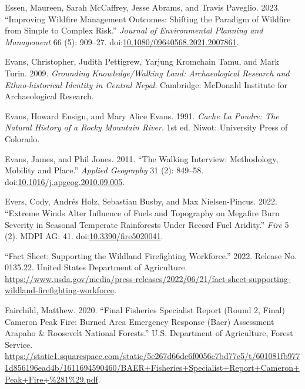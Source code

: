 \documentclass[
]{article}
\newlength{\cslhangindent}
\newenvironment{CSLReferences}[2] %
 {\begin{list}{}{%
  \setlength{\itemindent}{0pt}
  \setlength{\leftmargin}{0pt}
  \setlength{\parsep}{0pt}
  \ifodd #1
   \setlength{\leftmargin}{\cslhangindent}
   \setlength{\itemindent}{-1\cslhangindent}
  \fi
  \setlength{\itemsep}{#2\baselineskip}}}
 {\end{list}}
\begin{document}
\begin{CSLReferences}{1}{0}
Essen, Maureen, Sarah McCaffrey, Jesse Abrams, and Travis Paveglio. 2023. {``Improving Wildfire Management Outcomes: Shifting the Paradigm of Wildfire from Simple to Complex Risk.''} \emph{Journal of Environmental Planning and Management} 66 (5): 909--27. doi:\href{https://doi.org/10.1080/09640568.2021.2007861}{10.1080/09640568.2021.2007861}.

Evans, Christopher, Judith Pettigrew, Yarjung Kromchain Tamu, and Mark Turin. 2009. \emph{Grounding {Knowledge}/{Walking Land}: {Archaeological Research} and {Ethno-historical Identity} in {Central Nepal}}. Cambridge: McDonald Institute for Archaeological Research.

Evans, Howard Ensign, and Mary Alice Evans. 1991. \emph{Cache La {Poudre}: The Natural History of a {Rocky Mountain} River}. 1st ed. Niwot: University Press of Colorado.

Evans, James, and Phil Jones. 2011. {``The Walking Interview: {Methodology}, Mobility and Place.''} \emph{Applied Geography} 31 (2): 849--58. doi:\href{https://doi.org/10.1016/j.apgeog.2010.09.005}{10.1016/j.apgeog.2010.09.005}.

Evers, Cody, Andrés Holz, Sebastian Busby, and Max Nielsen-Pincus. 2022. {``Extreme {Winds Alter Influence} of {Fuels} and {Topography} on {Megafire Burn Severity} in {Seasonal Temperate Rainforests} Under {Record Fuel Aridity}.''} \emph{Fire} 5 (2). MDPI AG: 41. doi:\href{https://doi.org/10.3390/fire5020041}{10.3390/fire5020041}.

{``Fact {Sheet}: {Supporting} the {Wildland Firefighting Workforce}.''} 2022. Release No. 0135.22. United States Department of Agriculture. \url{https://www.usda.gov/media/press-releases/2022/06/21/fact-sheet-supporting-wildland-firefighting-workforce}.

Fairchild, Matthew. 2020. {``Final {Fisheries Specialist Report} ({Round} 2, {Final}) {Cameron Peak Fire}: {Burned Area Emergency Response} ({Baer}) {Assessment Arapaho} \& {Roosevelt National Forests}.''} U.S. Department of Agriculture, Forest Service. \url{https://static1.squarespace.com/static/5e267d66de6f0056c7bd77e5/t/601081fb9771d856196ead4b/1611694590460/BAER+Fisheries+Specialist+Report+Cameron+Peak+Fire+\%281\%29.pdf}.


\end{CSLReferences}
\end{document}
